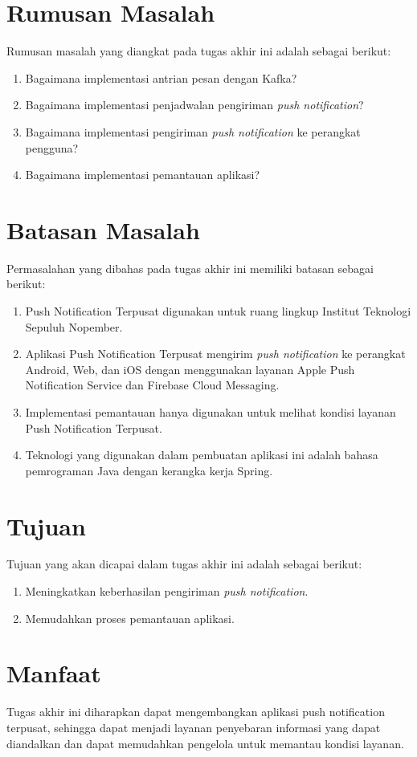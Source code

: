\section {Rumusan Masalah}
Rumusan masalah yang diangkat pada tugas akhir ini adalah sebagai berikut:
\begin {enumerate}
\item Bagaimana implementasi antrian pesan dengan Kafka?
\item Bagaimana implementasi penjadwalan pengiriman \textit{push notification}?
\item Bagaimana implementasi pengiriman \textit{push notification} ke perangkat pengguna?
\item Bagaimana implementasi pemantauan aplikasi?
\end {enumerate}

\section {Batasan Masalah}
Permasalahan yang dibahas pada tugas akhir ini memiliki batasan sebagai berikut:
\begin {enumerate}
\item Push Notification Terpusat digunakan untuk ruang lingkup Institut Teknologi Sepuluh Nopember.
\item Aplikasi Push Notification Terpusat mengirim \textit{push notification} ke perangkat Android, Web, dan iOS dengan menggunakan layanan Apple Push Notification Service dan Firebase Cloud Messaging.
\item Implementasi pemantauan hanya digunakan untuk melihat kondisi layanan Push Notification Terpusat.
\item Teknologi yang digunakan dalam pembuatan aplikasi ini adalah bahasa pemrograman Java dengan kerangka kerja Spring.
\end {enumerate}

\section {Tujuan}
Tujuan yang akan dicapai dalam tugas akhir ini adalah sebagai berikut:
\begin{enumerate}
	\item Meningkatkan keberhasilan pengiriman \textit{push notification}.
	\item Memudahkan proses pemantauan aplikasi.
\end{enumerate}

\section{Manfaat}
\par Tugas akhir ini diharapkan dapat mengembangkan aplikasi push notification terpusat, sehingga dapat menjadi layanan penyebaran informasi yang dapat diandalkan dan dapat memudahkan pengelola untuk memantau kondisi layanan.

